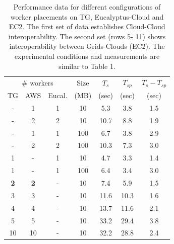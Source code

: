 \documentclass[3p,twocolumn]{elsarticle}
\begin{document}
\begin{table}
  \footnotesize
  \begin{tabular}{ccccccc}
    \hline
    \multicolumn{3}{c}{\# workers}  &  Size   &  $T_s$  & $T_{sp}$ & $T_s - T_{sp}$\\   
    TG &  AWS & Eucal. &  (MB)  & (sec) & (sec) & (sec) \\
    \hline
    - & 1 & 1 & 10   & 5.3 & 3.8 & 1.5\\
    - & 2 & 2 & 10   & 10.7 & 8.8 & 1.9 \\
    - & 1 & 1 & 100  & 6.7 & 3.8 & 2.9\\
    - & 2 & 2 & 100  & 10.3 & 7.3 & 3.0\\
    \hline 
    1 & - & 1 & 10   & 4.7 & 3.3 & 1.4\\
    1 & - & 1 & 100  & 6.4 & 3.4 & 3.0\\
    \hline 
    {\bf 2} &   {\bf 2} & - & 10 & 7.4 & 5.9 & 1.5 \\
    3 & 3 & - & 10 & 11.6 & 10.3 & 1.6 \\
    4 & 4 & - & 10 & 13.7 & 11.6 & 2.1 \\
    5 & 5 & - & 10 & 33.2 & 29.4 & 3.8 \\ 
    10 & 10 & - & 10 & 32.2 & 28.8 & 2.4 \\
    \hline
     \hline 
  \end{tabular}
  \caption{Performance data for different configurations of worker
  placements on TG, Eucalyptus-Cloud and EC2. The first set of data
  establishes Cloud-Cloud interoperability. The second set (rows 5-
  11) shows interoperability between Grids-Clouds (EC2).  The
  experimental conditions and measurements are similar to Table
  1.\label{stuff-2}}
\end{table}
\end{document}
